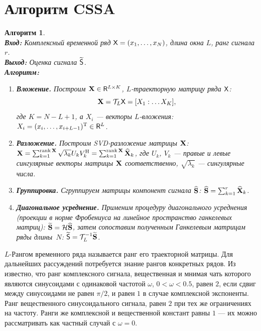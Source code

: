 \documentclass[12pt,a4paper]{article}
\newtheorem{algorithm}{Алгоритм}%
\begin{document}
\section{Алгоритм CSSA}
\label{sec:basessa}

\begin{algorithm}
\label{alg:ssa}
~\\
\textbf{Вход:} Комплексный временной ряд $\textsf{X} = (x_1, \dots, x_N)$, \emph{длина окна} $L$,
    ранг сигнала $r$.\\
\textbf{Выход:} Оценка сигнала $\widetilde{\textsf{S}}$.\\
\textbf{Алгоритм:}
\begin{enumerate}
    \item \textbf{Вложение.}
        \label{item:embedding}
        Построим $\mathbf{X} \in \mathsf{R}^{L \times K}$, \emph{$L$-траекторную матрицу} ряда $\textsf{X}$:
        $$\mathbf{X} = \mathcal{T}_L \textsf{X} = [X_1 : \dots X_K],$$
        где $K = N - L + 1$,
        а $X_i$ --- \emph{векторы $L$-вложения:}
        $X_i = (x_i, \dots, x_{i+L-1})^\mathrm{T} \in \mathsf{R}^L$.
    \item \textbf{Разложение.}
        \label{item:decomposition}
        Построим SVD-разложение матрицы $\mathbf{X}$:
        $\mathbf{X} =
        \sum_{k=1}^{\mathop{\mathrm{rank}} \mathbf{X}} \sqrt{\lambda_k} U_k V_k^\mathrm{H} = \sum_{k=1}^{\mathop{\mathrm{rank}} \mathbf{X}} \widehat{\mathbf{X}}_k$,
        где $U_k$, $V_k$ --- правые и левые сингулярные векторы матрицы $\mathbf{X}$ соответственно,
        $\sqrt{\lambda_k}$ --- сингулярные числа.
    \item \textbf{Группировка.} Сгруппируем матрицы компонент сигнала $\widehat{\mathbf{S}}$:
        $\widehat{\mathbf{S}} = \sum_{k=1}^r \widehat{\mathbf{X}}_k$.
    \item \textbf{Диагональное усреднение.}
        \label{item:reconstruction}
        Применим процедуру диагонального усреднения (проекции в норме Фробениуса
        на линейное пространство ганкелевых матриц):
        $\widetilde{\mathbf{S}} = \mathcal{H} \widehat{\mathbf{S}}$,
        затем сопоставим полученным Ганкелевым матрицам ряды длины~$N$:
        $\widetilde{\textsf{S}} = \mathcal{T}_L^{-1} \widetilde{\mathbf{S}}$.
\end{enumerate}
\end{algorithm}

$L$-Рангом временного ряда называется ранг его траекторной матрицы. Для дальнейших рассуждений потребуется знание рангов конкретных рядов.
Из \cite{Golyandina.Stepanov2005} известно, что ранг комплексного сигнала, вещественная и мнимая чать которого являются синусоидами с одинаковой частотой $\omega$, $0<\omega<0.5$, равен $2$, если сдвиг между синусоидами не равен $\pi/2$, и равен $1$ в случае комплексной экспоненты. Ранг вещественного синусоидального сигнала, равен  $2$ при тех же ограничениях на частоту. Ранги же комплексной и вещественной констант равны $1$ --- их можно рассматривать как частный случай с $\omega = 0$.
\end{document}
